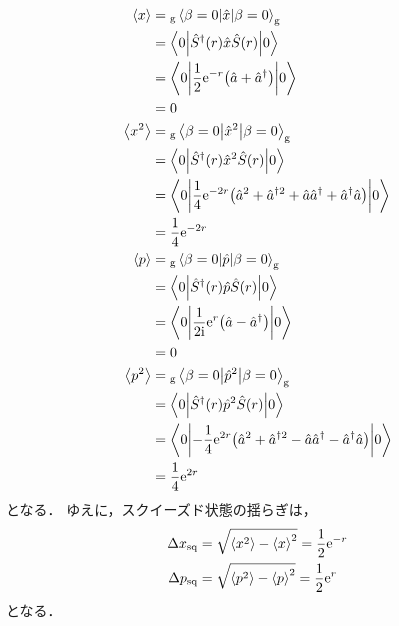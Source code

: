 \documentclass{report}
\begin{document}
    \begin{align}
      \ev{x} &= {}_{\r{g}}\mel**{\beta = 0}{\hat{x}}{\beta = 0}_{\r{g}} \\ 
      &= \mel**{0}{\hat{S}^{\dag}(r)\hat{x}\hat{S}(r)}{0} \\ 
      &= \mel**{0}{\frac{1}{2}\e^{-r}\qty(\hat{a} + \hat{a}^{\dag})}{0} \\ 
      &= 0 \\ 
      \ev{x^2} &= {}_{\r{g}}\mel**{\beta = 0}{\hat{x}^2}{\beta = 0}_{\r{g}} \\ 
      &= \mel**{0}{\hat{S}^{\dag}(r)\hat{x}^2\hat{S}(r)}{0} \\ 
      &= \mel**{0}{\frac{1}{4}\e^{-2r}\qty(\hat{a}^2 + \hat{a}^{\dag 2} + \hat{a}\hat{a}^{\dag} + \hat{a}^{\dag}\hat{a})}{0} \\ 
      &= \frac{1}{4}\e^{-2r} \\ 
      \ev{p} &= {}_{\r{g}}\mel**{\beta = 0}{\hat{p}}{\beta = 0}_{\r{g}} \\ 
      &= \mel**{0}{\hat{S}^{\dag}(r)\hat{p}\hat{S}(r)}{0} \\ 
      &= \mel**{0}{\frac{1}{2\i}\e^{r}\qty(\hat{a} - \hat{a}^{\dag})}{0} \\ 
      &= 0 \\ 
      \ev{p^2} &= {}_{\r{g}}\mel**{\beta = 0}{\hat{p}^2}{\beta = 0}_{\r{g}} \\ 
      &= \mel**{0}{\hat{S}^{\dag}(r)\hat{p}^2\hat{S}(r)}{0} \\ 
      &= \mel**{0}{-\frac{1}{4}\e^{2r}\qty(\hat{a}^2 + \hat{a}^{\dag 2} - \hat{a}\hat{a}^{\dag} - \hat{a}^{\dag}\hat{a})}{0} \\ 
      &= \frac{1}{4}\e^{2r}
    \end{align}
    となる．
    ゆえに，スクイーズド状態の揺らぎは，
    \begin{align}
      \Delta x_{\r{sq}} &= \sqrt{\ev{x^2} - \ev{x}^2} = \frac{1}{2}\e^{-r} \\ 
      \Delta p_{\r{sq}} &= \sqrt{\ev{p^2} - \ev{p}^2} = \frac{1}{2}\e^{r} 
    \end{align}
    となる．
\end{document}
